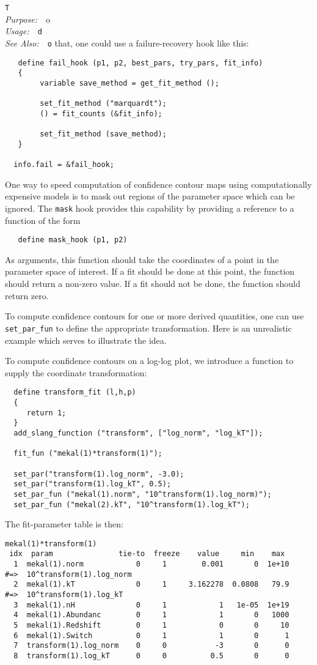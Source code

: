 \documentclass{book}
\makeatletter
\newif\ifpdf
\newenvironment{isisfunction}[4]%
{\index{{#1}@{\tt #1}}%
  \ifpdf
  \else
     \addcontentsline{toc}{subsection}{{#1} -- {#2}}
  \fi
  \vbox{
          \vspace*{\baselineskip}
          {\LARGE\tt #1}\vspace*{\baselineskip}\\
          {{\it Purpose:}~~{#2}}\\
          {{\it Usage:}~~{\tt #3}}\\
          {{\it See Also:}~~{\tt #4}}
       }
}%
{ }
\makeatother
\begin{document}
{\begin{isisfunction}
To do that, one could use a failure-recovery hook like this:
\begin{verbatim}
   define fail_hook (p1, p2, best_pars, try_pars, fit_info)
   {
        variable save_method = get_fit_method ();

        set_fit_method ("marquardt");
        () = fit_counts (&fit_info);

        set_fit_method (save_method);
   }

  info.fail = &fail_hook;
\end{verbatim}

One way to speed computation of confidence contour maps
using computationally expensive models is to mask out
regions of the parameter space which can be ignored.
The \verb|mask| hook provides this capability by providing
a reference to a function of the form
\begin{verbatim}
   define mask_hook (p1, p2)
\end{verbatim}
As arguments, this function should take the coordinates
of a point in the parameter space of interest.  If
a fit should be done at this point, the function should
return a non-zero value.  If a fit should not be done,
the function should return zero.

To compute confidence contours for one or more derived quantities,
one can use \verb|set_par_fun| to define the appropriate
transformation.  Here is an unrealistic example which serves to
illustrate the idea.

To compute confidence contours on a log-log plot, we
introduce a function to supply the coordinate transformation:
\begin{verbatim}
  define transform_fit (l,h,p)
  {
     return 1;
  }
  add_slang_function ("transform", ["log_norm", "log_kT"]);

  fit_fun ("mekal(1)*transform(1)");

  set_par("transform(1).log_norm", -3.0);
  set_par("transform(1).log_kT", 0.5);
  set_par_fun ("mekal(1).norm", "10^transform(1).log_norm)");
  set_par_fun ("mekal(2).kT", "10^transform(1).log_kT");
\end{verbatim}
The fit-parameter table is then:
\begin{verbatim}
mekal(1)*transform(1)
 idx  param               tie-to  freeze    value     min    max
  1  mekal(1).norm            0     1        0.001       0  1e+10
#=>  10^transform(1).log_norm
  2  mekal(1).kT              0     1     3.162278  0.0808   79.9
#=>  10^transform(1).log_kT
  3  mekal(1).nH              0     1            1   1e-05  1e+19
  4  mekal(1).Abundanc        0     1            1       0   1000
  5  mekal(1).Redshift        0     1            0       0     10
  6  mekal(1).Switch          0     1            1       0      1
  7  transform(1).log_norm    0     0           -3       0      0
  8  transform(1).log_kT      0     0          0.5       0      0
\end{verbatim}


\end{isisfunction}}
\end{document}
